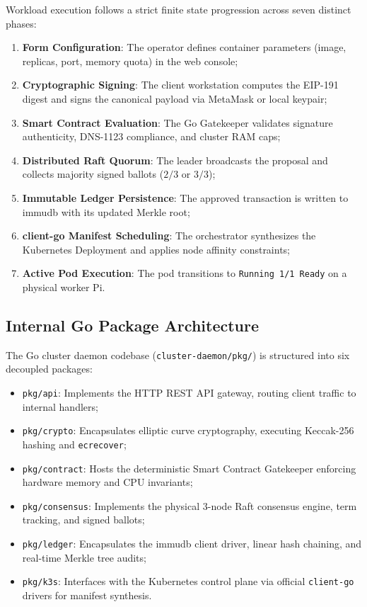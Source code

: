 \documentclass[a4paper,12pt]{article}
\begin{document}
Workload execution follows a strict finite state progression across seven distinct phases:
\begin{enumerate}[leftmargin=1.2cm]
    \item \textbf{Form Configuration}: The operator defines container parameters (image, replicas, port, memory quota) in the web console;
    \item \textbf{Cryptographic Signing}: The client workstation computes the EIP-191 digest and signs the canonical payload via MetaMask or local keypair;
    \item \textbf{Smart Contract Evaluation}: The Go Gatekeeper validates signature authenticity, DNS-1123 compliance, and cluster RAM caps;
    \item \textbf{Distributed Raft Quorum}: The leader broadcasts the proposal and collects majority signed ballots ($2/3$ or $3/3$);
    \item \textbf{Immutable Ledger Persistence}: The approved transaction is written to immudb with its updated Merkle root;
    \item \textbf{client-go Manifest Scheduling}: The orchestrator synthesizes the Kubernetes Deployment and applies node affinity constraints;
    \item \textbf{Active Pod Execution}: The pod transitions to \texttt{Running 1/1 Ready} on a physical worker Pi.
\end{enumerate}

\subsection{Internal Go Package Architecture}

The Go cluster daemon codebase (\texttt{cluster-daemon/pkg/}) is structured into six decoupled packages:
\begin{itemize}[leftmargin=1.2cm]
    \item \texttt{pkg/api}: Implements the HTTP REST API gateway, routing client traffic to internal handlers;
    \item \texttt{pkg/crypto}: Encapsulates elliptic curve cryptography, executing Keccak-256 hashing and \texttt{ecrecover};
    \item \texttt{pkg/contract}: Hosts the deterministic Smart Contract Gatekeeper enforcing hardware memory and CPU invariants;
    \item \texttt{pkg/consensus}: Implements the physical 3-node Raft consensus engine, term tracking, and signed ballots;
    \item \texttt{pkg/ledger}: Encapsulates the immudb client driver, linear hash chaining, and real-time Merkle tree audits;
    \item \texttt{pkg/k3s}: Interfaces with the Kubernetes control plane via official \texttt{client-go} drivers for manifest synthesis.
\end{itemize}
\end{document}
